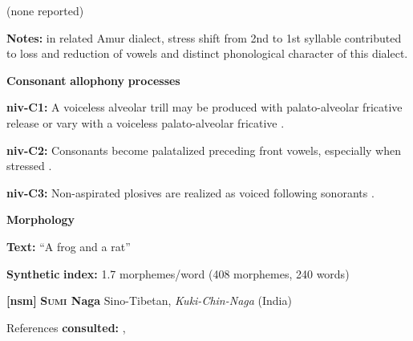 \begin{styleBody}
(none reported)
\end{styleBody}

\begin{styleBody}
\textbf{Notes:} in related Amur dialect, stress shift from 2nd to 1st syllable contributed to loss and reduction of vowels and distinct phonological character of this dialect.
\end{styleBody}

\begin{styleBody}
\textbf{Consonant} \textbf{allophony} \textbf{processes}
\end{styleBody}

\begin{styleBody}
\textbf{niv-C1:} A voiceless alveolar trill may be produced with palato-alveolar fricative release or vary with a voiceless palato-alveolar fricative \citep[26]{Shiraishi2006}.
\end{styleBody}

\begin{styleBody}
\textbf{niv-C2:} Consonants become palatalized preceding front vowels, especially when stressed \citep[23]{Shiraishi2006}.
\end{styleBody}

\begin{styleBody}
\textbf{niv-C3:} Non-aspirated plosives are realized as voiced following sonorants \citep[25]{Shiraishi2006}.
\end{styleBody}

\begin{styleBody}
\textbf{Morphology}
\end{styleBody}

\begin{styleBody}
\textbf{Text:} “A frog and a rat” \citep[58-61]{Gruzdeva1998}
\end{styleBody}

\begin{styleBody}
\textbf{Synthetic} \textbf{index:} 1.7 morphemes/word (408 morphemes, 240 words)
\end{styleBody}

\begin{styleBody}
\textbf{[nsm]}   \textbf{\textsc{Sumi} \textbf{Naga}}  Sino-Tibetan, \textit{Kuki-Chin-Naga} (India)
\end{styleBody}

\begin{styleBody}
References \textbf{consulted:} \citet{Teo2009}, \citet{Teo2012}
\end{styleBody}

